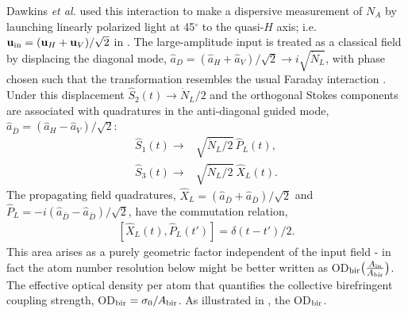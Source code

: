 \documentclass[preprint,aps,pra,onecolumn]{revtex4-1} %
\newcommand{\inp}{{\rm in}}
\newcommand{\Abiref}{A_{\rm bir}}
\newcommand{\comment}[1]{{\color{Maroon} #1}}
\begin{document}
Dawkins {\em et al.} \cite{dawkins_dispersive_2011} used this interaction to make a dispersive measurement of $N_A$ by launching linearly polarized light at 45$^\circ$ to the quasi-$H$ axis; i.e. $\mbf{u}_\inp = (\mbf{u}_H + \mbf{u}_V )/\sqrt{2}$ in . The large-amplitude input is treated as a classical field by displacing the diagonal mode, $\hat{a}_D = (\hat{a}_H + \hat{a}_V)/\sqrt{2} \rightarrow i\sqrt{\dot{N}_L}$, with phase chosen such that the transformation resembles the usual Faraday interaction \cite{}. Under this displacement $\hat{S}_2(t) \rightarrow \dot{N}_L/2$ and the orthogonal Stokes components are associated with quadratures in the anti-diagonal guided mode, $\hat{a}_{\bar{D}} = (\hat{a}_H - \hat{a}_V)/\sqrt{2}$:
	\begin{align}
		\hat{S}_1(t) \rightarrow & \sqrt{\dot{N}_L/2} \, \hat{P}_L(t), \\ 
		\hat{S}_3(t) \rightarrow & \sqrt{\dot{N}_L/2} \ \hat{X}_L(t).
\end{align}
The propagating field quadratures, $\hat{X}_L = (\hat{a}_{\bar{D}} + \hat{a}_{\bar{D}})/\sqrt{2}$ and $\hat{P}_L = -i(\hat{a}_{\bar{D}} - \hat{a}_{\bar{D}})/\sqrt{2}$, have the commutation relation,
	\begin{align} \label{Eq::XPcommutator}
		[ \hat{X}_L(t), \hat{P}_L(t') ] = \delta(t-t')/2.
	\end{align}
 \comment{This area arises as a purely geometric factor independent of the input field - in fact the atom number resolution below might be better written as OD$_{\rm bir}\big( \smallfrac{A_\inp}{\Abiref} \big)$.}  The effective optical density per atom that quantifies the collective birefringent coupling strength, OD$_{\rm bir} = \sigma_0/\Abiref$.  As illustrated in \frf{}, the OD$_{\rm bir}$. 
\end{document}
